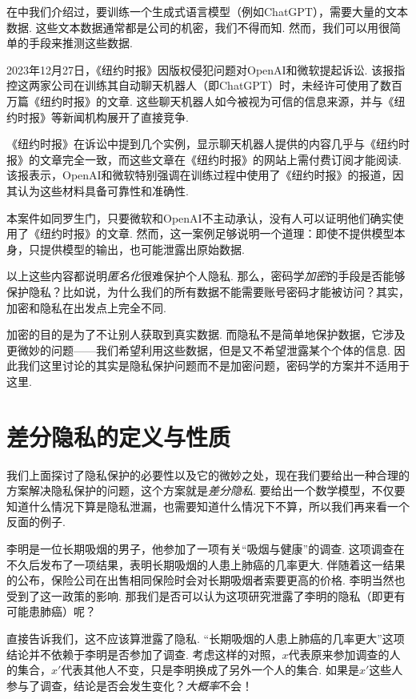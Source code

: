 在中我们介绍过，要训练一个生成式语言模型（例如ChatGPT），需要大量的文本数据. 这些文本数据通常都是公司的机密，我们不得而知. 然而，我们可以用很简单的手段来推测这些数据. 

2023年12月27日，《纽约时报》因版权侵犯问题对OpenAI和微软提起诉讼. 该报指控这两家公司在训练其自动聊天机器人（即ChatGPT）时，未经许可使用了数百万篇《纽约时报》的文章. 这些聊天机器人如今被视为可信的信息来源，并与《纽约时报》等新闻机构展开了直接竞争. 

《纽约时报》在诉讼中提到几个实例，显示聊天机器人提供的内容几乎与《纽约时报》的文章完全一致，而这些文章在《纽约时报》的网站上需付费订阅才能阅读. 该报表示，OpenAI和微软特别强调在训练过程中使用了《纽约时报》的报道，因其认为这些材料具备可靠性和准确性. 

本案件如同罗生门，只要微软和OpenAI不主动承认，没有人可以证明他们确实使用了《纽约时报》的文章. 然而，这一案例足够说明一个道理：即使不提供模型本身，只提供模型的输出，也可能泄露出原始数据.

\begin{remark}
以上这些内容都说明\emph{匿名化}很难保护个人隐私. 那么，密码学\emph{加密}的手段是否能够保护隐私？比如说，为什么我们的所有数据不能需要账号密码才能被访问？其实，加密和隐私在出发点上完全不同. 

加密的目的是为了不让别人获取到真实数据. 而隐私不是简单地保护数据，它涉及更微妙的问题——我们希望利用这些数据，但是又不希望泄露某个个体的信息. 因此我们这里讨论的其实是隐私保护问题而不是加密问题，密码学的方案并不适用于这里.
\end{remark}

\section{差分隐私的定义与性质}

我们上面探讨了隐私保护的必要性以及它的微妙之处，现在我们要给出一种合理的方案解决隐私保护的问题，这个方案就是\emph{差分隐私}. 要给出一个数学模型，不仅要知道什么情况下算是隐私泄漏，也需要知道什么情况下不算，所以我们再来看一个反面的例子. 

李明是一位长期吸烟的男子，他参加了一项有关“吸烟与健康”的调查. 这项调查在不久后发布了一项结果，表明长期吸烟的人患上肺癌的几率更大. 伴随着这一结果的公布，保险公司在出售相同保险时会对长期吸烟者索要更高的价格. 李明当然也受到了这一政策的影响. 那我们是否可以认为这项研究泄露了李明的隐私（即更有可能患肺癌）呢？

直接告诉我们，这不应该算泄露了隐私. “长期吸烟的人患上肺癌的几率更大”这项结论并不依赖于李明是否参加了调查. 考虑这样的对照，$x$代表原来参加调查的人的集合，$x'$代表其他人不变，只是李明换成了另外一个人的集合. 如果是$x'$这些人参与了调查，结论是否会发生变化？\emph{大概率}不会！

